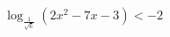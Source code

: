 \begin{ex}[type=inequality]
	\begin{condition}
		\( \log_{\frac{1}{\sqrt{6}}} (2x^2-7x-3)<-2 \)
	\end{condition}
\end{ex}
